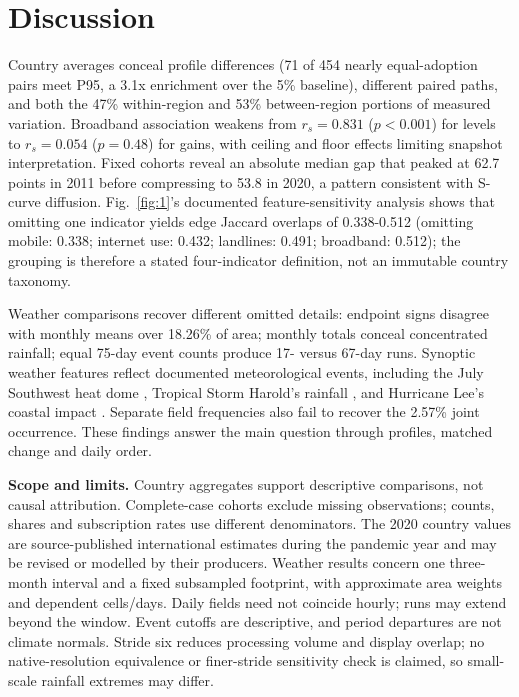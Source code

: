 \documentclass[conference,a4paper]{IEEEtran}
\begin{document}
\FloatBarrier

\section{Discussion}

Country averages conceal profile differences (71 of 454 nearly equal-adoption pairs meet P95, a 3.1x enrichment over the 5\% baseline), different paired paths, and both the 47\% within-region and 53\% between-region portions of measured variation. Broadband association weakens from $r_s = 0.831$ ($p < 0.001$) for levels to $r_s = 0.054$ ($p = 0.48$) for gains, with ceiling and floor effects limiting snapshot interpretation. Fixed cohorts reveal an absolute median gap that peaked at 62.7 points in 2011 before compressing to 53.8 in 2020, a pattern consistent with S-curve diffusion. Fig.~\ref{fig:1}'s documented feature-sensitivity analysis shows that omitting one indicator yields edge Jaccard overlaps of 0.338-0.512 (omitting mobile: 0.338; internet use: 0.432; landlines: 0.491; broadband: 0.512); the grouping is therefore a stated four-indicator definition, not an immutable country taxonomy.

Weather comparisons recover different omitted details: endpoint signs disagree with monthly means over 18.26\% of area; monthly totals conceal concentrated rainfall; equal 75-day event counts produce 17- versus 67-day runs. Synoptic weather features reflect documented meteorological events, including the July Southwest heat dome \cite{ref9}, Tropical Storm Harold's rainfall \cite{ref16}, and Hurricane Lee's coastal impact \cite{ref17}. Separate field frequencies also fail to recover the 2.57\% joint occurrence. These findings answer the main question through profiles, matched change and daily order.



\textbf{Scope and limits.} Country aggregates support descriptive comparisons, not causal attribution. Complete-case cohorts exclude missing observations; counts, shares and subscription rates use different denominators. The 2020 country values are source-published international estimates during the pandemic year and may be revised or modelled by their producers. Weather results concern one three-month interval and a fixed subsampled footprint, with approximate area weights and dependent cells/days. Daily fields need not coincide hourly; runs may extend beyond the window. Event cutoffs are descriptive, and period departures are not climate normals. Stride six reduces processing volume and display overlap; no native-resolution equivalence or finer-stride sensitivity check is claimed, so small-scale rainfall extremes may differ.
\end{document}
